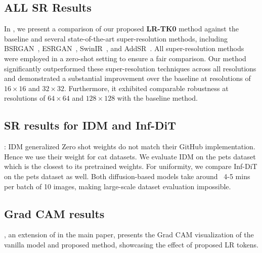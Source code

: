 \subsection{ALL SR Results}

In , we present a comparison of our proposed \textbf{LR-TK0} method against the baseline and several state-of-the-art super-resolution methods, including BSRGAN~\cite{zhang2021designing}, ESRGAN~\cite{wang2018esrgan}, SwinIR~\cite{liang2021swinir}, and AddSR~\cite{xie2024addsr}. All super-resolution methods were employed in a zero-shot setting to ensure a fair comparison. Our method significantly outperformed these super-resolution techniques across all resolutions and demonstrated a substantial improvement over the baseline at resolutions of $16\times16$ and $32\times32$. Furthermore, it exhibited comparable robustness at resolutions of $64\times64$ and $128\times128$ with the baseline method.





\subsection{SR results for IDM and Inf-DiT}
\textbf{}: 
IDM generalized Zero shot weights do not match their GitHub implementation. Hence we use their weight for cat datasets. 
We evaluate IDM on the pets dataset which is the closest to its pretrained weights. 
For uniformity, we compare Inf-DiT on the pets dataset as well. Both diffusion-based models take around ~4-5 mins per batch of 10 images, making large-scale dataset evaluation impossible. 

\subsection{Grad CAM results}
\textbf{}, an extension of   in the main paper, presents the Grad CAM visualization of the vanilla model and proposed method, showcasing the effect of proposed LR tokens.



